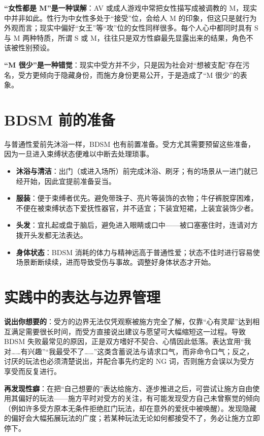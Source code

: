 \documentclass[12pt,UTF8]{ctexbook}
\begin{document}
\noindent\textbf{“女性都是 M”是一种误解}：AV 或成人游戏中常把女性描写成被调教的 M，现实中并非如此。性行为中女性多处于“接受”位，会给人 M 的印象，但这只是就行为外观而言；现实中偏好“女王”等“攻”位的女性同样很多。每个人心中都同时具有 S 与 M 两种特质，所谓 S 或 M，往往只是双方性癖最先显露出来的结果，角色不该被性别预设。

\noindent\textbf{“M 很少”是一种错觉}：现实中受方并不少，只是因为社会对“想被支配”存在污名，受方更倾向于隐藏身份，而施方身份更易公开，于是造成了“M 很少”的表象。

\section{BDSM 前的准备}

与普通性爱前先沐浴一样，BDSM 也有前置准备。受方尤其需要预留这些准备，因为一旦进入束缚状态便难以中断去处理琐事。

\begin{itemize}
\item \textbf{沐浴与清洁}：出门（或进入场所）前完成沐浴、刷牙；有的场景从一进门就已经开始，因此宜提前准备妥当。
\item \textbf{服装}：便于束缚者优先。避免带珠子、亮片等装饰的衣物；牛仔裤脱穿困难，不便在被束缚状态下爱抚性器官，并不适宜；下装宜短裙，上装宜装饰少者。
\item \textbf{头发}：宜扎起或盘于脑后，避免进入眼睛或口中——被口塞塞住时，连请对方拨开头发都无法表达。
\item \textbf{身体状态}：BDSM 消耗的体力与精神远高于普通性爱；状态不佳时进行容易使场景断断续续，进而导致受伤与事故。调整好身体状态才开始。
\end{itemize}

\section{实践中的表达与边界管理}

\noindent\textbf{说出你想要的}：受方的边界无法仅凭观察被施方完全了解，仅靠“心有灵犀”达到相互满足需要很长时间，而受方直接说出建议与愿望可大幅缩短这一过程。导致 BDSM 失败最常见的原因，正是双方嗜好不契合、心情因此低落。表达宜用“我对……有兴趣”“我最受不了……”这类含蓄说法与请求口气，而非命令口气；反之，讨厌的玩法也必须清楚说出，并配合事先约定的 NG 词，否则施方会误以为受方享受而反复进行。

\noindent\textbf{再发现性癖}：在把“自己想要的”表达给施方、逐步推进之后，可尝试让施方自由使用其偏好的玩法——施方平时对受方的关注，有可能发现受方自己未曾察觉的倾向（例如许多受方原本无条件拒绝肛门玩法，却在意外的爱抚中被唤醒）。发现隐藏的偏好会大幅拓展玩法的广度；若某种玩法无论如何都接受不了，务必让施方立即停下。
\end{document}
